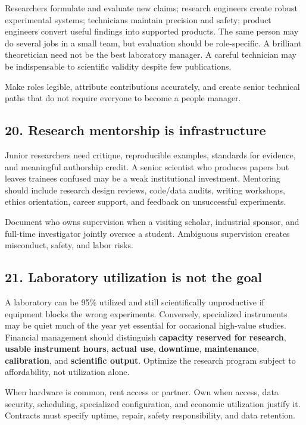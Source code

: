 Researchers formulate and evaluate new claims; research engineers create robust experimental systems; technicians maintain precision and safety; product engineers convert useful findings into supported products. The same person may do several jobs in a small team, but evaluation should be role-specific. A brilliant theoretician need not be the best laboratory manager. A careful technician may be indispensable to scientific validity despite few publications.

Make roles legible, attribute contributions accurately, and create senior technical paths that do not require everyone to become a people manager.

\subsection{20. Research mentorship is infrastructure}

Junior researchers need critique, reproducible examples, standards for evidence, and meaningful authorship credit. A senior scientist who produces papers but leaves trainees confused may be a weak institutional investment. Mentoring should include research design reviews, code/data audits, writing workshops, ethics orientation, career support, and feedback on unsuccessful experiments.

Document who owns supervision when a visiting scholar, industrial sponsor, and full-time investigator jointly oversee a student. Ambiguous supervision creates misconduct, safety, and labor risks.

\subsection{21. Laboratory utilization is not the goal}

A laboratory can be 95\% utilized and still scientifically unproductive if equipment blocks the wrong experiments. Conversely, specialized instruments may be quiet much of the year yet essential for occasional high-value studies. Financial management should distinguish \textbf{capacity reserved for research}, \textbf{usable instrument hours}, \textbf{actual use}, \textbf{downtime}, \textbf{maintenance}, \textbf{calibration}, and \textbf{scientific output}. Optimize the research program subject to affordability, not utilization alone.

When hardware is common, rent access or partner. Own when access, data security, scheduling, specialized configuration, and economic utilization justify it. Contracts must specify uptime, repair, safety responsibility, and data retention.

